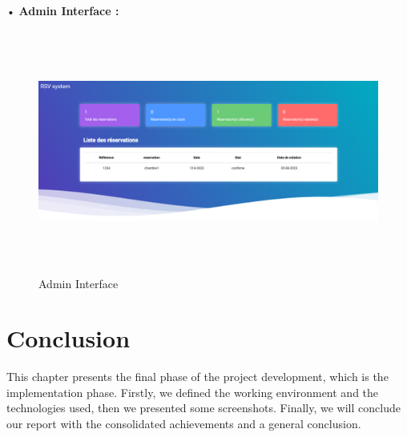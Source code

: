 •\textbf{ Admin Interface   :}

\begin{figure}[H]
   \centering
    \includegraphics[width=15cm,height=8cm]{images/consint.png}
    \caption{Admin Interface } 
    \label{Admin Interface }
\end{figure}







\section{Conclusion}
This chapter presents the final phase of the project development, which is the implementation phase. Firstly, we defined the working environment and the technologies used, then we presented some screenshots. Finally, we will conclude our report with the consolidated achievements and a general conclusion. 